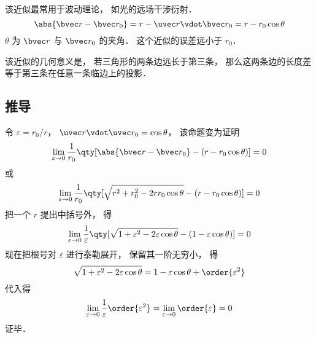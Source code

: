 

该近似最常用于波动理论， 如光的远场干涉衍射．
\begin{equation}
\abs{\bvec r - \bvec r_0} = r - \uvec r \vdot \bvec r_0 = r - r_0 \cos\theta
\end{equation}
$\theta$ 为 $\bvec r$ 与 $\bvec r_0$ 的夹角． 这个近似的误差远小于 $r_0$．

该近似的几何意义是， 若三角形的两条边远长于第三条， 那么这两条边的长度差等于第三条在任意一条临边上的投影． %

\subsection{推导}

令 $\varepsilon = r_0 / r$， $\uvec r \vdot \uvec r_0 = \cos\theta$， 该命题变为证明
\begin{equation}
\lim_{\varepsilon \to 0} \frac{1}{r_0} \qty[\abs{\bvec r - \bvec r_0} - (r - r_0 \cos\theta)] = 0
\end{equation}
或
\begin{equation}
\lim_{\varepsilon \to 0} \frac{1}{r_0} \qty[\sqrt{r^2 + r_0^2 - 2rr_0\cos\theta} - (r - r_0 \cos\theta)] = 0
\end{equation}
把一个 $r$ 提出中括号外， 得
\begin{equation}
\lim_{\varepsilon \to 0} \frac{1}{\varepsilon} \qty[\sqrt{1 + \varepsilon^2 - 2\varepsilon\cos\theta} - (1 - \varepsilon \cos\theta)] = 0
\end{equation}
现在把根号对 $\varepsilon$ 进行泰勒展开， 保留其一阶无穷小， 得
\begin{equation}
\sqrt{1 + \varepsilon^2 - 2\varepsilon\cos\theta} = 1 - \varepsilon \cos\theta + \order{\varepsilon^2}
\end{equation}
代入得
\begin{equation}
\lim_{\varepsilon \to 0} \frac1\varepsilon \order{\varepsilon^2} = \lim_{\varepsilon \to 0} \order{\varepsilon} = 0
\end{equation}
证毕．
